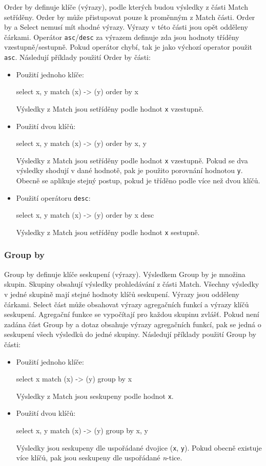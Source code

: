 Order by definuje klíče (výrazy), podle kterých budou výsledky z části Match setříděny.
Order by může přistupovat pouze k proměnným z Match části.
Order by a Select nemusí mít shodné výrazy.
Výrazy v této části jsou opět odděleny čárkami.
Operátor \texttt{asc}/\texttt{desc} za výrazem definuje zda jsou hodnoty tříděny vzestupně/sestupně.
Pokud operátor chybí, tak je jako výchozí operator použit \texttt{asc}.
Následují příklady použití Order by části:
\begin{itemize}
\item
Použití jednoho klíče:
\begin{code}
select x, y match (x) -> (y) order by x
\end{code}
Výsledky z Match jsou setříděny podle hodnot \texttt{x} vzestupně.

\item
Použití dvou klíčů:
\begin{code}
select x, y match (x) -> (y) order by x, y
\end{code}
Výsledky z Match jsou setříděny podle hodnot \texttt{x} vzestupně.
Pokud se dva výsledky shodují v dané hodnotě, pak je použito porovnání hodnotou \texttt{y}.
Obecně se aplikuje stejný postup, pokud je tříděno podle více než dvou klíčů.

\item
Použití operátoru \texttt{desc}:
\begin{code}
select x, y match (x) -> (y) order by x desc
\end{code}
Výsledky z Match jsou setříděny podle hodnot \texttt{x} sestupně.
\end{itemize}

\subsubsection{Group by}

Group by definuje klíče seskupení (výrazy).
Výsledkem Group by je množina skupin.
Skupiny obsahují výsledky prohledávání z části Match.
Všechny výsledky v jedné skupině mají stejné hodnoty klíčů seskupení. 
Výrazy jsou odděleny čárkami.
Select část může obsahovat výrazy agregačních funkcí a výrazy klíčů seskupení.
Agregační funkce se vypočítají pro každou skupinu zvlášť.
Pokud není zadána část Group by a dotaz obsahuje výrazy agregačních funkcí, pak se jedná o seskupení všech výsledků do jedné skupiny.
Následují příklady použití Group by části:
\begin{itemize}
\item
Použití jednoho klíče:
\begin{code}
select x match (x) -> (y) group by x
\end{code}
Výsledky z Match jsou seskupeny podle hodnot \texttt{x}.

\item
Použití dvou klíčů:
\begin{code}
select x, y match (x) -> (y) group by x, y
\end{code}
Výsledky jsou seskupeny dle uspořádané dvojice (\texttt{x}, \texttt{y}).
Pokud obecně existuje více klíčů, pak jsou seskupeny dle uspořádané \textit{n}-tice.
\end{itemize}